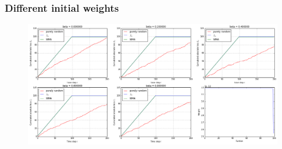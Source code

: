 \documentclass{beamer}
\begin{document}
\begin{frame}
	\frametitle{Different initial weights }
	\begin{figure}
		\includegraphics[scale=0.25]{exo6_01loss_ordered.png}
	\end{figure}
\end{frame}
\end{document}
